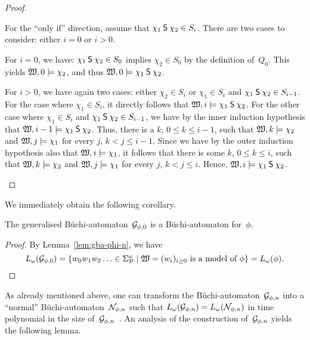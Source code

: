 \begin{proof}
\begin{itemize}
            For the \enquote{only if} direction, assume that
            $\chi_1\mathbin{\mathsf{S}}\chi_2\in S_i$.  There are two cases to consider:
            either $i=0$ or $i>0$.

            For $i=0$, we have: $\chi_1\mathbin{\mathsf{S}}\chi_2\in S_0$ implies
            $\chi_2\in S_0$ by the definition of~$Q_0$.  This yields
            $\mathfrak{W},0\models\chi_2$, and thus $\mathfrak{W},0\models\chi_1\mathbin{\mathsf{S}}\chi_2$.

            For $i>0$, we have again two cases: either $\chi_2\in S_i$ or
            $\chi_1\in S_i$ and $\chi_1\mathbin{\mathsf{S}}\chi_2\in S_{i-1}$.  For the case
            where $\chi_1\in S_i$, it directly follows that
            $\mathfrak{W},i\models\chi_1\mathbin{\mathsf{S}}\chi_2$.  For the other case where
            $\chi_1\in S_i$ and $\chi_1\mathbin{\mathsf{S}}\chi_2\in S_{i-1}$, we have by the
            inner induction hypothesis that $\mathfrak{W},i-1\models\chi_1\mathbin{\mathsf{S}}\chi_2$.
            Thus, there is a $k$, $0\le k\le i-1$, such that
            $\mathfrak{W},k\models\chi_2$ and $\mathfrak{W},j\models\chi_1$ for every $j$,
            $k<j\le i-1$.  Since we have by the outer induction hypothesis also
            that $\mathfrak{W},i\models\chi_1$, it follows that there is some $k$,
            $0\le k\le i$, such that $\mathfrak{W},k\models\chi_2$ and
            $\mathfrak{W},j\models\chi_1$ for every $j$, $k<j\le i$.  Hence,
            $\mathfrak{W},i\models\chi_1\mathbin{\mathsf{S}}\chi_2$.
    \end{itemize}
\end{proof}

\noindent
We immediately obtain the following corollary.

\begin{corollary}
    The generalised Büchi-automaton~$\mathcal{G}_{\phi,0}$ is a Büchi-automaton
    for~$\phi$.
\end{corollary}

\begin{proof}
    By Lemma~\ref{lem:gba-phi-n}, we have
    \[L_\omega(\Gmc_{\phi,0})=\{w_0w_1w_2\dotso\in\Sigma_\Pmc^\omega\mid%
        \Wmf=(w_i)_{i\ge 0}\ \text{is a model of $\phi$}\}=L_\omega(\phi).\]
\end{proof}

\noindent
As already mentioned above, one can transform the
Büchi-automaton~$\mathcal{G}_{\phi,n}$ into a \enquote{normal}
Büchi-automaton~$\mathcal{N}_{\phi,n}$ such that
$L_\omega(\mathcal{G}_{\phi,n})=L_\omega(\mathcal{N}_{\phi,n})$ in time polynomial in the size
of~$\mathcal{G}_{\phi,n}$~\cite{GPV+-PSTV96,BaKa-08}.
%
An analysis of the construction of~$\mathcal{G}_{\phi,n}$ yields the following lemma.

